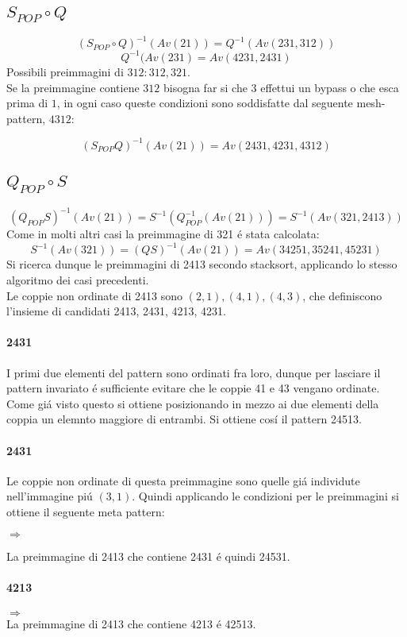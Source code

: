 \subsection*{$S_{POP}\circ{Q}$}$$(S_{POP}\circ{Q})^{-1}(Av(21))=Q^{-1}(Av(231,312))$$$$Q^{-1}(Av(231)=Av(4231,2431)$$
Possibili preimmagini di $312: 312, 321$.\\
Se la preimmagine contiene $312$ bisogna far si che $3$ effettui un bypass o che esca prima di $1$, in ogni caso queste condizioni sono soddisfatte dal seguente mesh-pattern, $4312$:
\begin{center}
\end{center}
$$(S_{POP}{Q})^{-1}(Av(21))=Av(2431,4231,4312)$$
\subsection*{$Q_{POP}\circ{S}$}
$$(Q_{POP}{S})^{-1}(Av(21)) = S^{-1}(Q_{POP}^{-1}(Av(21))) = S^{-1}(Av(321, 2413))$$
Come in molti altri casi la preimmagine di 321 \'e stata calcolata:$$S^{-1}(Av(321)) = (QS)^{-1}(Av(21)) = Av(34251, 35241, 45231)$$
Si ricerca dunque le preimmagini di 2413 secondo stacksort, applicando lo stesso algoritmo dei casi precedenti.\\
Le coppie non ordinate di 2413 sono $(2,1),(4,1),(4,3)$, che definiscono l'insieme di candidati 2413, 2431, 4213, 4231.
\paragraph*{2431} I primi due elementi del pattern sono ordinati fra loro, dunque per lasciare il pattern invariato \'e sufficiente evitare che le coppie 41 e 43 vengano ordinate. Come gi\'a visto questo si ottiene posizionando in mezzo ai due elementi della coppia un elemnto maggiore di entrambi. Si ottiene cos\'i  il pattern 24513.
\paragraph*{2431} Le coppie non ordinate di questa preimmagine sono quelle gi\'a individute nell'immagine pi\'u $(3,1)$. Quindi applicando le condizioni per le preimmagini si ottiene il seguente meta pattern:
\begin{center}$\Rightarrow$\end{center}
La preimmagine di 2413 che contiene 2431 \'e quindi 24531.
\paragraph*{4213}\begin{center}$\Rightarrow$\\La preimmagine di 2413 che contiene 4213 \'e 42513.\end{center}
